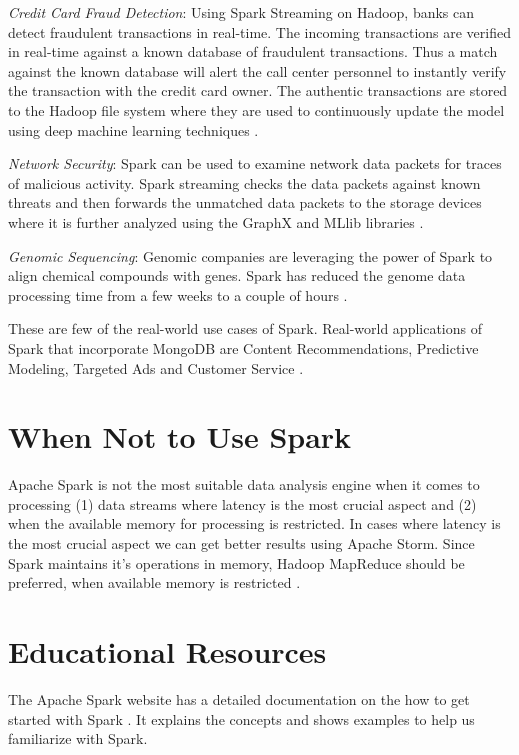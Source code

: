 \documentclass[9pt,twocolumn,twoside]{../../styles/osajnl}
\begin{document}
\textit{Credit Card Fraud Detection}: Using Spark Streaming on Hadoop,
banks can detect fraudulent transactions in real-time. The incoming
transactions are verified in real-time against a known database of
fraudulent transactions. Thus a match against the known database will
alert the call center personnel to instantly verify the transaction
with the credit card owner. The authentic transactions are stored to
the Hadoop file system where they are used to continuously update the
model using deep machine learning techniques
\cite{www-spark-linkedin}.

\textit{Network Security}: Spark can be used to examine network data
packets for traces of malicious activity. Spark streaming checks the
data packets against known threats and then forwards the unmatched
data packets to the storage devices where it is further analyzed using
the GraphX and MLlib libraries \cite{www-spark-linkedin}.

\textit{Genomic Sequencing}: Genomic companies are leveraging the
power of Spark to align chemical compounds with genes. Spark has
reduced the genome data processing time from a few weeks to a couple
of hours \cite{www-spark-linkedin}.

These are few of the real-world use cases of Spark. Real-world
applications of Spark that incorporate MongoDB are Content
Recommendations, Predictive Modeling, Targeted Ads and Customer
Service \cite{www-spark-mongodb}.

\section{When Not to Use Spark}
Apache Spark is not the most suitable data analysis engine when it
comes to processing (1) data streams where latency is the most crucial
aspect and (2) when the available memory for processing is
restricted. In cases where latency is the most crucial aspect we can
get better results using Apache Storm. Since Spark maintains it's
operations in memory, Hadoop MapReduce should be preferred, when
available memory is restricted \cite{article-spark-persp}.

\section{Educational Resources}
 The Apache Spark website has a detailed documentation on the how to
 get started with Spark \cite{www-apache-spark}. It explains the
 concepts and shows examples to help us familiarize with Spark.
\end{document}
